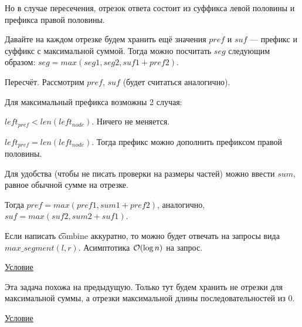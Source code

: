 Но в случае пересечения, отрезок ответа состоит из суффикса левой половины и префикса правой половины. 
\down

Давайте на каждом отрезке будем хранить ещё значения $pref$ и $suf$ --- префикс и суффикс с максимальной суммой. Тогда можно посчитать $seg$ следующим образом: $seg=max(seg1,seg2,suf1+pref2)$.

\begin{center}
	\begin{figure}[h]
	\end{figure}
\end{center}

Пересчёт. Рассмотрим $pref$, $suf$ (будет считаться аналогично).

Для максимальный префикса возможны 2 случая:

\up \up
\begin{MyList}[0pt]
	\item $left_{pref} < len(left_{node})$. Ничего не меняется.
	\item $left_{pref} = len(left_{node})$. Тогда префикс можно дополнить префиксом правой половины.
\end{MyList}
\up \up

Для удобства (чтобы не писать проверки на размеры частей) можно ввести $sum$, равное обычной сумме на отрезке.

Тогда $pref=max(pref1,sum1+pref2)$, аналогично, $suf=max(suf2,sum2+suf1)$.

Если написать \t{combine} аккуратно, то можно будет отвечать на запросы вида $max\_segment(l, r)$. Асимптотика $\mathcal{O}(\log n)$ на запрос.

 \href{https://informatics.mccme.ru/mod/statements/view3.php?chapterid=111798}{Условие}

Эта задача похожа на предыдущую. Только тут будем хранить не отрезки для максимальной суммы, а отрезки максимальной длины последовательностей из 0.

 \href{https://informatics.mccme.ru/mod/statements/view.php?chapterid=113632}{Условие}

